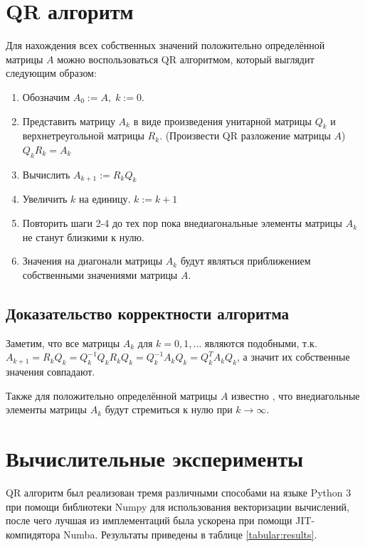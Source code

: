 \documentclass[12pt, fleqn]{article}
\begin{document}
\section{QR алгоритм}

Для нахождения всех собственных значений положительно определённой матрицы $A$ можно воспользоваться QR алгоритмом, который выглядит следующим образом:
\begin{enumerate}
	\item Обозначим $A_0 := A, \; k := 0$.
	\item Представить матрицу $A_k$ в виде произведения унитарной матрицы $Q_k$ и верхнетреугольной матрицы $R_k$. (Произвести QR разложение матрицы $A$) $Q_k R_k = A_k$
	\item Вычислить $A_{k+1} := R_k Q_k$
	\item Увеличить $k$ на единицу. $k := k + 1$
	\item Повторить шаги 2-4 до тех пор пока внедиагональные элементы матрицы $A_k$ не станут близкими к нулю.
	\item Значения на диагонали матрицы $A_k$ будут являться приближением собственными значениями матрицы $A$.
\end{enumerate}

\subsection{Доказательство корректности алгоритма}
Заметим, что все матрицы $A_k$ для $k = 0, 1, \dots$ являются подобными, т.к. \\
$A_{k + 1} = R_k Q_k = Q_k^{-1} Q_k R_k Q_k = Q_k^{-1} A_k Q_k = Q_k^T A_k Q_k$, а значит их собственные значения совпадают.

Также для положительно определённой матрицы $A$ известно \cite{QR}, что внедиагольные элементы матрицы $A_k$ будут стремиться к нулю при $k \to \infty$.

\section{Вычислительные эксперименты}

QR алгоритм был реализован тремя различными способами на языке Python 3 при помощи библиотеки Numpy для использования векторизации вычислений, после чего лучшая из имплементаций была ускорена при помощи JIT-компидятора Numba. Результаты приведены в таблице \ref{tabular:results}.
\end{document}
